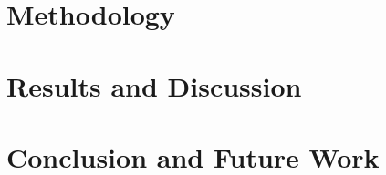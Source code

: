 \documentclass[a4paper,12pt]{report}
\begin{document}
\chapter{Methodology}

\chapter{Results and Discussion}

\chapter{Conclusion and Future Work}

\fontsize{12}{8}\selectfont


\end{document}
